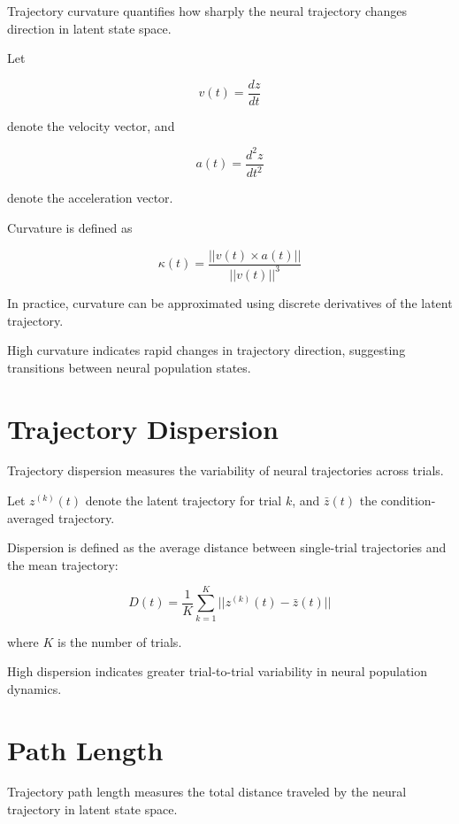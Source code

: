 \documentclass[11pt]{report}
\begin{document}
Trajectory curvature quantifies how sharply the neural trajectory
changes direction in latent state space.

Let

\begin{equation}
v(t) = \frac{dz}{dt}
\end{equation}

denote the velocity vector, and

\begin{equation}
a(t) = \frac{d^2 z}{dt^2}
\end{equation}

denote the acceleration vector.

Curvature is defined as

\begin{equation}
\kappa(t) =
\frac{||v(t) \times a(t)||}{||v(t)||^3}
\end{equation}

In practice, curvature can be approximated using discrete derivatives
of the latent trajectory.

High curvature indicates rapid changes in trajectory direction,
suggesting transitions between neural population states.

\section{Trajectory Dispersion}

Trajectory dispersion measures the variability of neural trajectories
across trials.

Let $z^{(k)}(t)$ denote the latent trajectory for trial $k$, and
$\bar{z}(t)$ the condition-averaged trajectory.

Dispersion is defined as the average distance between single-trial
trajectories and the mean trajectory:

\begin{equation}
D(t) =
\frac{1}{K}
\sum_{k=1}^{K}
||z^{(k)}(t) - \bar{z}(t)||
\end{equation}

where $K$ is the number of trials.

High dispersion indicates greater trial-to-trial variability in neural
population dynamics.

\section{Path Length}

Trajectory path length measures the total distance traveled by the
neural trajectory in latent state space.
\end{document}

